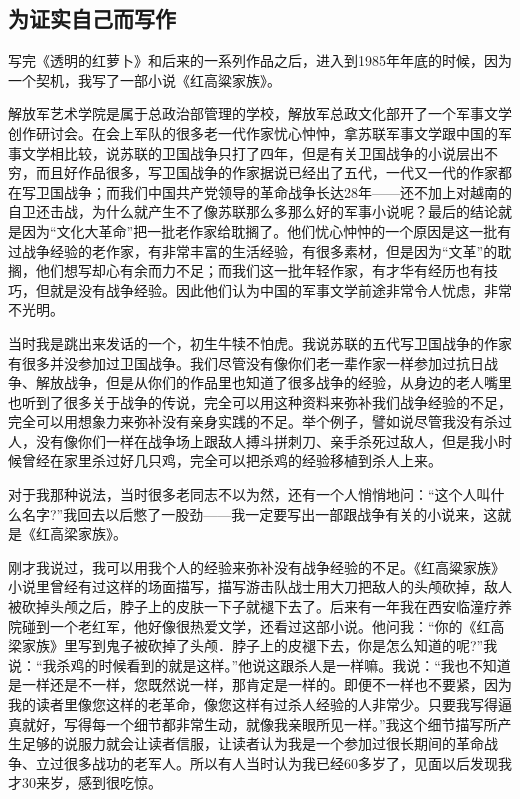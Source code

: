 \documentclass[12pt,a5paper]{ctexbook}
\begin{document}
\subsection{为证实自己而写作}

写完《透明的红萝卜》和后来的一系列作品之后，进入到1985年年底的时候，因为一个契机，我写了一部小说《红高粱家族》。

解放军艺术学院是属于总政治部管理的学校，解放军总政文化部开了一个军事文学创作研讨会。在会上军队的很多老一代作家忧心忡忡，拿苏联军事文学跟中国的军事文学相比较，说苏联的卫国战争只打了四年，但是有关卫国战争的小说层出不穷，而且好作品很多，写卫国战争的作家据说已经出了五代，一代又一代的作家都在写卫国战争；而我们中国共产党领导的革命战争长达28年——还不加上对越南的自卫还击战，为什么就产生不了像苏联那么多那么好的军事小说呢？最后的结论就是因为“文化大革命”把一批老作家给耽搁了。他们忧心忡忡的一个原因是这一批有过战争经验的老作家，有非常丰富的生活经验，有很多素材，但是因为“文革”的耽搁，他们想写却心有余而力不足；而我们这一批年轻作家，有才华有经历也有技巧，但就是没有战争经验。因此他们认为中国的军事文学前途非常令人忧虑，非常不光明。

当时我是跳出来发话的一个，初生牛犊不怕虎。我说苏联的五代写卫国战争的作家有很多并没参加过卫国战争。我们尽管没有像你们老一辈作家一样参加过抗日战争、解放战争，但是从你们的作品里也知道了很多战争的经验，从身边的老人嘴里也听到了很多关于战争的传说，完全可以用这种资料来弥补我们战争经验的不足，完全可以用想象力来弥补没有亲身实践的不足。举个例子，譬如说尽管我没有杀过人，没有像你们一样在战争场上跟敌人搏斗拼刺刀、亲手杀死过敌人，但是我小时候曾经在家里杀过好几只鸡，完全可以把杀鸡的经验移植到杀人上来。

对于我那种说法，当时很多老同志不以为然，还有一个人悄悄地问：“这个人叫什么名字?”我回去以后憋了一股劲——我一定要写出一部跟战争有关的小说来，这就是《红高梁家族》。

刚才我说过，我可以用我个人的经验来弥补没有战争经验的不足。《红高粱家族》小说里曾经有过这样的场面描写，描写游击队战士用大刀把敌人的头颅砍掉，敌人被砍掉头颅之后，脖子上的皮肤一下子就褪下去了。后来有一年我在西安临潼疗养院碰到一个老红军，他好像很热爱文学，还看过这部小说。他问我：“你的《红高梁家族》里写到鬼子被砍掉了头颅．脖子上的皮褪下去，你是怎么知道的呢?”我说：“我杀鸡的时候看到的就是这样。”他说这跟杀人是一样嘛。我说：“我也不知道是一样还是不一样，您既然说一样，那肯定是一样的。即便不一样也不要紧，因为我的读者里像您这样的老革命，像您这样有过杀人经验的人非常少。只要我写得逼真就好，写得每一个细节都非常生动，就像我亲眼所见一样。”我这个细节描写所产生足够的说服力就会让读者信服，让读者认为我是一个参加过很长期间的革命战争、立过很多战功的老军人。所以有人当时认为我已经60多岁了，见面以后发现我才30来岁，感到很吃惊。
\end{document}
